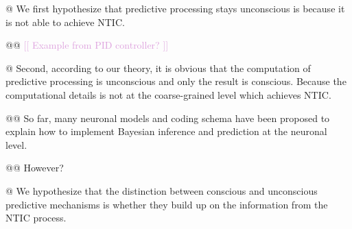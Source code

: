 \documentclass[utf8]{article}
\newenvironment{ants}
			{
			 \begin{easylist}[itemize]
		 	}
			{
			\end{easylist}
			} %
\newcommand{\idea}[2][Plum]{\noindent
				\textcolor{#1}{[[ #2 ]]}}
\begin{document}
\begin{ants}

				@ We first hypothesize that predictive processing stays unconscious is because it is not able to achieve NTIC.

					@@ \idea{Example from PID controller?}

				@ Second, according to our theory, it is obvious that the computation of predictive processing is unconscious and only the result is conscious. Because the computational details is not at the coarse-grained level which achieves NTIC.

					@@ So far, many neuronal models and coding schema have been proposed to explain how to implement Bayesian inference and prediction at the neuronal level.

					@@ However?


				@ We hypothesize that the distinction between conscious and unconscious predictive mechanisms is whether they build up on the information from the NTIC process.





			\end{ants}
\end{document}
